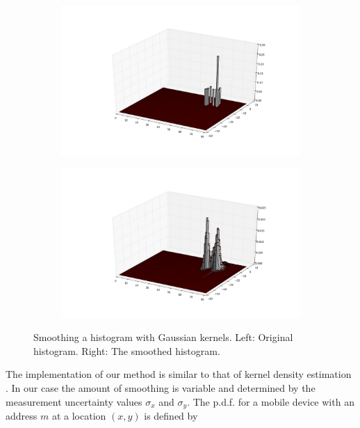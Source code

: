 \documentclass[10pt,a4paper]{article}
\begin{document}
\begin{figure}[h!]
	\centering
	\begin{subfigure}{.4\textwidth}
		\centering
		\includegraphics[width=1\linewidth]{non-smoothed-histo.png}
	\end{subfigure}%
	\begin{subfigure}{.4\textwidth}
		\centering
		\includegraphics[width=1\linewidth]{smoothed-histo.png}
	\end{subfigure}
	\caption{Smoothing a histogram with Gaussian kernels. Left: Original histogram. Right: The smoothed histogram.}
	\label{fig:smoothing}
\end{figure}


The implementation of our method is similar to that of kernel density estimation \cite{scott}\cite{silverman}.
In our case the amount of smoothing is variable and determined by the measurement uncertainty values $\sigma_{x}$ and $\sigma_{y}$.
The p.d.f.  for a mobile device with an address  $m$ at a location $(x,y)$ is defined by
\end{document}
